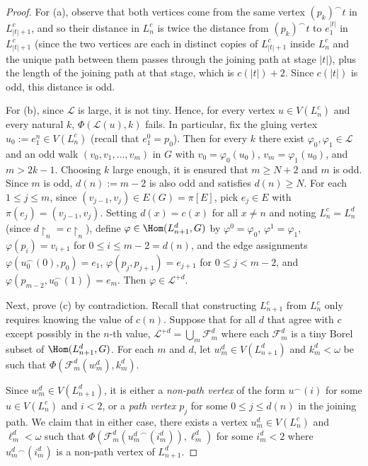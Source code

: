 \documentclass[12pt]{article}
\begin{document}
\begin{proof}
    For (a), observe that both vertices come from the same vertex $(p_k)^\smallfrown t$ in $L^c_{|t|+1}$, and so their distance in $L^c_n$ is twice the distance from $(p_k)^\smallfrown t$ to $e_1^{|t|}$ in $L^c_{|t|+1}$ (since the two vertices are each in distinct copies of $L^c_{|t|+1}$ inside $L^c_n$ and the unique path between them passes through the joining path at stage $|t|$), plus the length of the joining path at that stage, which is $c(|t|)+2$.
    Since $c(|t|)$ is odd, this distance is odd.

    For (b), since $\mathcal L$ is large, it is not tiny.
    Hence, for every vertex $u\in V(L^c_n)$ and every natural $k$, $\Phi(\mathcal L(u),k)$ fails.
    In particular, fix the gluing vertex $u_0:=e_1^n\in V(L^c_n)$ (recall that $e_1^0=p_0$).
    Then for every $k$ there exist $\varphi_0,\varphi_1\in\mathcal L$ and an odd walk $(v_0,v_1,\dots,v_m)$ in $G$ with $v_0=\varphi_0(u_0)$, $v_m=\varphi_1(u_0)$, and $m>2k-1$.
    Choosing $k$ large enough, it is ensured that $m\geq N+2$ and $m$ is odd.
    Since $m$ is odd, $d(n):=m-2$ is also odd and satisfies $d(n)\geq N$.
    For each $1\leq j\leq m$, since $(v_{j-1},v_j)\in E(G)=\pi[E]$, pick $e_j\in E$ with $\pi(e_j)=(v_{j-1},v_j)$.
    Setting $d(x)=c(x)$ for all $x\neq n$ and noting $L^c_n=L^d_n$ (since $d\restriction_n=c\restriction_n$), define $\varphi\in\Hom(L_{n+1}^d,G)$ by $\varphi^0=\varphi_0$, $\varphi^1=\varphi_1$, $\varphi(p_i)=v_{i+1}$ for $0\leq i\leq m-2=d(n)$, and the edge assignments $\varphi(u_0^\frown (0),p_0)=e_1$, $\varphi(p_j,p_{j+1})=e_{j+1}$ for $0\leq j<m-2$, and $\varphi(p_{m-2},u_0^\frown (1))=e_m$.
    Then $\varphi\in\mathcal L^{+d}$.

    Next, prove (c) by contradiction.
    Recall that constructing $L^c_{n+1}$ from $L^c_n$ only requires knowing the value of $c(n)$.
    Suppose that for all $d$ that agree with $c$ except possibly in the $n$-th value, $\mathcal L^{+d}=\bigcup_m\mathcal F^d_m$ where each $\mathcal F^d_m$ is a tiny Borel subset of $\Hom(L^d_{n+1},G)$.
    For each $m$ and $d$, let $w^d_m\in V(L^d_{n+1})$ and $k^d_m<\omega$ be such that $\Phi(\mathcal F^d_m(w^d_m),k^d_m)$.
    
    Since $w^d_m\in V(L^d_{n+1})$, it is either a \emph{non-path vertex} of the form $u^\smallfrown(i)$ for some $u\in V(L^c_n)$ and $i<2$, or a \emph{path vertex} $p_j$ for some $0\leq j\leq d(n)$ in the joining path.
    We claim that in either case, there exists a vertex $u^d_m\in V(L^c_n)$ and $\ell^d_m<\omega$ such that $\Phi(\mathcal F^d_m({u^d_m}^\smallfrown(i^d_m)),\ell^d_m)$ for some $i^d_m<2$ where $u^d_m{}^\smallfrown(i^d_m)$ is a non-path vertex of $L^d_{n+1}$.


\end{proof}
\end{document}
